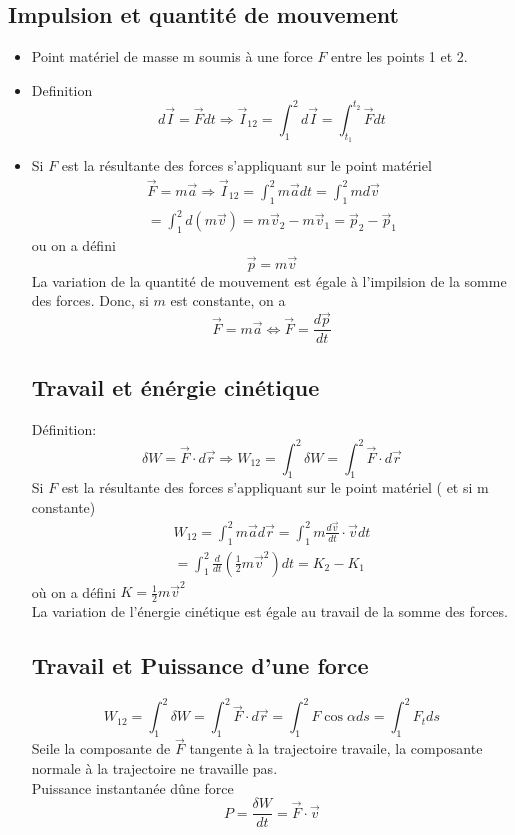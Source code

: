 \documentclass[../main.tex]{subfiles}
\begin{document}
\subsection{Impulsion et quantité de mouvement}
\begin{itemize}
\item Point matériel de masse m soumis à une force $F$ entre les points 1 et 2.
\item Definition
	\[ 
	d \vec{I} = \vec{F} dt \Rightarrow \vec{I}_{12}  = \int_{1}^{2} d \vec{I} = \int_{t_1}^{t_2} \vec{F} dt
	\]

\item Si $F$ est la résultante des forces s'appliquant sur le point matériel
	\begin{align*}
	\vec{F} = m \vec{a} \Rightarrow \vec{I}_{12} = \int_{1}^{2} m \vec{a} dt = \int_{1}^{2}m d \vec{v}\\
	= \int_{1}^{2} d ( m \vec{v}) = m \vec{v}_2 - m \vec{v}_1 = \vec{p}_2 - \vec{p}_1
	\end{align*}
	ou on a défini
	\[ 
	\vec{p}= m \vec{v}
	\]
	La variation de la quantité de mouvement est égale à l'impilsion de la somme des forces.
	Donc, si $m$ est constante, on a
	\[ 
	\vec{F}= m \vec{a} \iff \vec{F} = \frac{d \vec{p}}{dt}
	\]
	
\subsection{Travail et énérgie cinétique}
Définition:
\[ 
\delta W = \vec{F} \cdot d \vec{r} \Rightarrow W_{12} = \int_{1}^{2} \delta W = \int_{1}^{2} \vec{F} \cdot d \vec{r}
\]
Si $F$ est la résultante des forces s'appliquant sur le point matériel ( et si m constante) 
\begin{align*}
W_{12} = \int_{1}^{2} m \vec{a} d \vec{r} = \int_{1}^{2} m \frac{d \vec{v}}{dt} \cdot \vec{v}d t\\
= \int_{1}^{2} \frac{d}{dt} ( \frac{1}{2}m \vec{v}^{2})dt = K_2 - K_1
\end{align*}
où on a défini $K= \frac{1}{2}m \vec{v}^{2}$\\
La variation de l'énergie cinétique est égale au travail de la somme des forces.
\subsection{Travail et Puissance d'une force}
\[ 
W_{12} = \int_{1}^{2} \delta W = \int_{1}^{2} \vec{F} \cdot d \vec{r} = \int_{1}^{2} F \cos \alpha d s = \int_{1}^{2}F_t ds
\]
Seile la composante de $\vec{F}$ tangente à la trajectoire travaile, la composante normale à la trajectoire ne travaille pas.\\
Puissance instantanée dûne force
\[ 
P=  \frac{\delta W}{dt} = \vec{F}\cdot \vec{v}
\]



	
\end{itemize}
\end{document}
